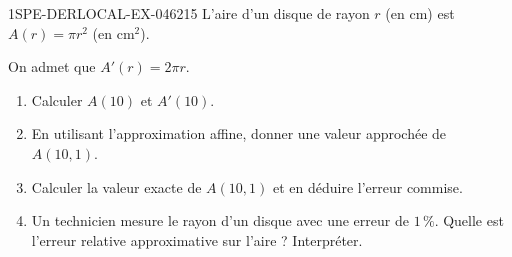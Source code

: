 \begin{exercice}{1SPE-DERLOCAL-EX-046}{2}{15}
L'aire d'un disque de rayon $r$ (en cm) est $A(r) = \pi r^2$ (en cm$^2$).

On admet que $A'(r) = 2\pi r$.
\begin{enumerate}
\item Calculer $A(10)$ et $A'(10)$.
\item En utilisant l'approximation affine, donner une valeur approchée de $A(10{,}1)$.
\item Calculer la valeur exacte de $A(10{,}1)$ et en déduire l'erreur commise.
\item Un technicien mesure le rayon d'un disque avec une erreur de $1\,\%$. Quelle est l'erreur relative approximative sur l'aire ? Interpréter.
\end{enumerate}
\end{exercice}
